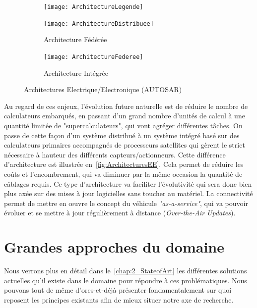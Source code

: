 \documentclass[french, a4paper, 11pt, twoside, pdftex]{StyleThese}
\begin{document}
	\begin{figure}[ht!]
		\centering
		\begin{subfigure}{\textwidth} \centering
			\texttt{[image: ArchitectureLegende]}
		\end{subfigure}
		\newline
		\begin{subfigure}{0.5\textwidth} \centering
			\texttt{[image: ArchitectureDistribuee]}
			\caption{Architecture Fédérée}
			\label{fig:ArchiDistrib}
		\end{subfigure}
		\begin{subfigure}{0.45\textwidth} \centering
			\texttt{[image: ArchitectureFederee]}
			\caption{Architecture Intégrée}
			\label{fig:ArchiFederee}
		\end{subfigure}
		\caption{Architectures Electrique/Electronique (AUTOSAR)}
		\label{fig:ArchitecturesEE}
	\end{figure}
	
	Au regard de ces enjeux, l'évolution future naturelle est de réduire le nombre de calculateurs embarqués, en passant d'un grand nombre d'unités de calcul à une quantité limitée de "supercalculateurs", qui vont agréger différentes tâches. On passe de cette façon d'un système distribué à un système intégré basé sur des calculateurs primaires accompagnés de processeurs satellites qui gèrent le strict nécessaire à hauteur des différents capteurs/actionneurs. Cette différence d'architecture est illustrée en~\autoref{fig:ArchitecturesEE}. Cela permet de réduire les coûts et l'encombrement, qui va diminuer par la même occasion la quantité de câblages requis. Ce type d'architecture va faciliter l'évolutivité qui sera donc bien plus axée sur des mises à jour logicielles sans toucher au matériel. La connectivité permet de mettre en œuvre le concept du véhicule \textit{"as-a-service"}, qui va pouvoir évoluer et se mettre à jour régulièrement à distance (\textit{Over-the-Air Updates}). 
	
	
\section{Grandes approches du domaine}

	Nous verrons plus en détail dans le~\autoref{chap:2_StateofArt} les différentes solutions actuelles qu'il existe dans le domaine pour répondre à ces problématiques. Nous pouvons tout de même d'ores-et-déjà présenter fondamentalement sur quoi reposent les principes existants afin de mieux situer notre axe de recherche.
	
\end{document}
